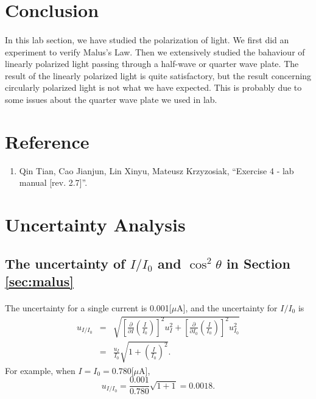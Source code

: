 \documentclass{my_template}
\begin{document}
    \section{Conclusion}
    \paragraph{} In this lab section, we have studied the polarization of light. We first did an experiment to verify Malus's Law. Then we extensively studied the bahaviour of linearly polarized light passing through a half-wave or quarter wave plate. The result of the linearly polarized light is quite satisfactory, but the result concerning circularly polarized light is not what we have expected. This is probably due to some issues about the quarter wave plate we used in lab. 
    \section{Reference}
    \begin{enumerate}[1.]
        \item Qin Tian, Cao Jianjun, Lin Xinyu, Mateusz Krzyzosiak, ``Exercise 4 - lab manual [rev. 2.7]''.
    \end{enumerate}
    \renewcommand\thesection{\Alph{section}} 
    \setcounter{section}{0}
    \newpage
    \section{Uncertainty Analysis}
    \subsection{The uncertainty of $I/I_0$ and $\cos^2\theta$ in Section \ref{sec:malus}}
    \paragraph{}The uncertainty for a single current is 0.001[$\mu$A], and the uncertainty for $I/I_0$ is 
    \begin{eqnarray*}
        u_{I/I_0}&=&\sqrt{\left[\frac{\partial}{\partial I}\left(\frac{I}{I_0}\right)\right]^2u_I^2+\left[\frac{\partial}{\partial I_0}\left(\frac{I}{I_0}\right)\right]^2u_{I_0}^2}\\
        &=&\frac{u_I}{I_0}\sqrt{1+\left(\frac{I}{I_0}\right)^2}.
    \end{eqnarray*}
    For example, when $I=I_0=0.780[\mu$A], $$u_{I/I_0}=\frac{0.001}{0.780}\sqrt{1+1}=0.0018.$$
    \vspace{-5mm}
\end{document}
